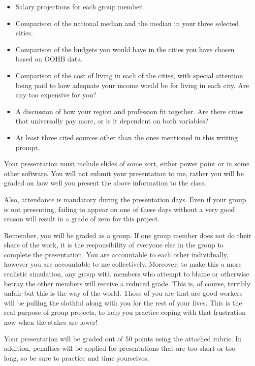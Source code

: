 \documentclass{article}
\begin{document}
\begin{itemize}
	\item Salary projections for each group member.
	\item Comparison of the national median and the median in your three selected cities.
	\item Comparison of the budgets you would have in the cities you have chosen based on OOHB data.
	\item Comparison of the cost of living in each of the cities, with special attention being paid to how adequate your income would be for living in each city.  Are any too expensive for you?
	\item A discussion of how your region and profession fit together.  Are there cities that universally pay more, or is it dependent on both variables?
	\item At least three cited sources other than the ones mentioned in this writing prompt.
\end{itemize}

Your presentation must include slides of some sort, either power point
or in some other software.  You will not submit your presentation to
me, rather you will be graded on how well you present the above
information to the class.

Also, attendance is mandatory during the presentation days.  Even if
your group is not presenting, failing to appear on one of these days
without a very good reason will result in a grade of zero for this
project.

Remember, you will be graded as a group. If one group member does not
do their share of the work, it is the responsibility of everyone else
in the group to complete the presentation.  You are accountable to
each other individually, however you are accountable to me
collectively. Moreover, to make this a more realistic simulation, any
group with members who attempt to blame or otherwise betray the other
members will receive a reduced grade. This is, of course, terribly
unfair but this is the way of the world.  Those of you are that are
good workers will be pulling the slothful along with you for the rest
of your lives. This is the real purpose of group projects, to help you
practice coping with that frustration now when the stakes are lower!  

Your presentation will be graded out of 50 points using the
attached rubric. In addition, penalties will be applied for
presentations that are too short or too long, so be sure to practice
and time yourselves.


\end{document}
